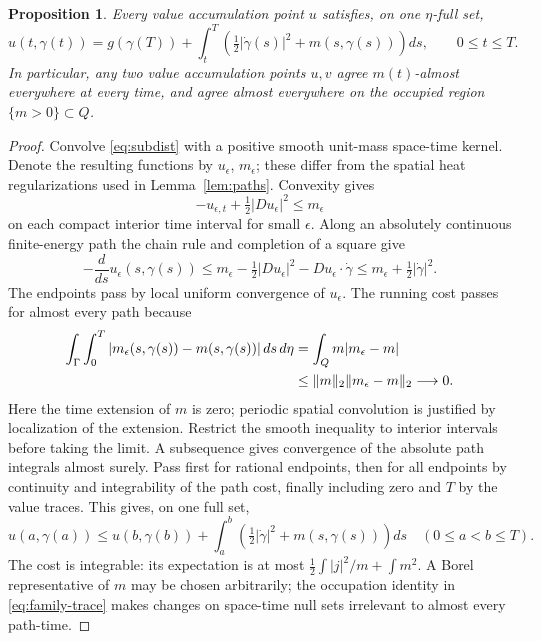 \documentclass[11pt]{article}
\numberwithin{equation}{section}
\newtheorem{proposition}[theorem]{Proposition}
\begin{document}
\begin{proposition}\label{prop:calibration}
Every value accumulation point \(u\) satisfies, on one \(\eta\)-full set,
\begin{equation}\label{eq:calibrated}
 u(t,\gamma(t))=g(\gamma(T))+
 \int_t^T\left(\tfrac12|\dot\gamma(s)|^2+
                          m(s,\gamma(s))\right)ds,\qquad 0\le t\le T.
\end{equation}
In particular, any two value accumulation points \(u,v\) agree
\(m(t)\)-almost everywhere at every time, and agree almost everywhere
on the occupied region \(\{m>0\}\subset Q\).
\end{proposition}

\begin{proof}
Convolve \eqref{eq:subdist} with a positive smooth unit-mass
space-time kernel. Denote the resulting functions by \(u_\epsilon\),
\(m_\epsilon\); these differ from the spatial heat regularizations
used in Lemma~\ref{lem:paths}. Convexity gives
\[
 -u_{\epsilon,t}+\tfrac12|Du_\epsilon|^2\le m_\epsilon
\]
on each compact interior time interval for small \(\epsilon\).
Along an absolutely continuous finite-energy path the chain rule and
completion of a square give
\[
 -\frac d{ds}u_\epsilon(s,\gamma(s))
 \le m_\epsilon-\tfrac12|Du_\epsilon|^2
                      -Du_\epsilon\cdot\dot\gamma
 \le m_\epsilon+\tfrac12|\dot\gamma|^2 .
\]
The endpoints pass by local uniform convergence of \(u_\epsilon\).
The running cost passes for almost every path because
\begin{align}
 \int_\Gamma\int_0^T
 |m_\epsilon(s,\gamma(s))-m(s,\gamma(s))|\,ds\,d\eta
 &=\int_Qm|m_\epsilon-m| \notag\\
 &\le\|m\|_2\|m_\epsilon-m\|_2\longrightarrow0 .
 \label{eq:family-trace}
\end{align}
Here the time extension of \(m\) is zero; periodic spatial convolution
is justified by localization of the extension. Restrict the smooth
inequality to interior intervals before taking the limit.
A subsequence gives convergence of the absolute path integrals almost
surely. Pass first for rational endpoints, then for all endpoints by
continuity and integrability of the path cost, finally including
zero and \(T\) by the value traces. This gives, on one full set,
\begin{equation}\label{eq:path-ineq}
 u(a,\gamma(a))\le u(b,\gamma(b))+
 \int_a^b\left(\tfrac12|\dot\gamma|^2+m(s,\gamma(s))\right)ds
 \quad(0\le a<b\le T).
\end{equation}
The cost is integrable: its expectation is at most
\(\frac12\int |j|^2/m+\int m^2\).
A Borel representative of \(m\) may be chosen arbitrarily; the
occupation identity in \eqref{eq:family-trace} makes changes on
space-time null sets irrelevant to almost every path-time.


\end{proof}
\end{document}
